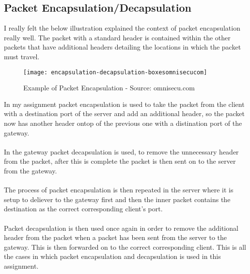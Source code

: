 \documentclass[10pt]{article}
\begin{document}
\subsection{Packet Encapsulation/Decapsulation}
	I really felt the below illustration explained the context of packet encapsulation really well. The packet with a standard header is contained within the other packets that have additional headers detailing the locations in which the packet must travel.
\begin{description}
	\item
\begin{figure}[h!]
	\texttt{[image: encapsulation-decapsulation-boxesomnisecucom]}
	\caption{Example of Packet Encapsulation - Source: omnisecu.com}
	\label{fig:packetEncapsulation}
\end{figure}
\end{description}
In my assignment packet encapsulation is used to take the packet from the client with a destination port of the server and add an additional header, so the packet now has another header ontop of the previous one with a distination port of the gateway.\\\\
In the gateway packet decapsulation is used, to remove the unnecessary header from the packet, after this is complete the packet is then sent on to the server from the gateway.\\\\
The process of packet encapsulation is then repeated in the server where it is setup to deliever to the gateway first and then the inner packet contains the destination as the correct corresponding client's port.\\\\
Packet decapsulation is then used once again in order to remove the additional header from the packet when a packet has been sent from the server to the gateway. This is then forwarded on to the correct corresponding client. This is all the cases in which packet encapsulation and decapsulation is used in this assignment.
 \newpage
\end{document}
